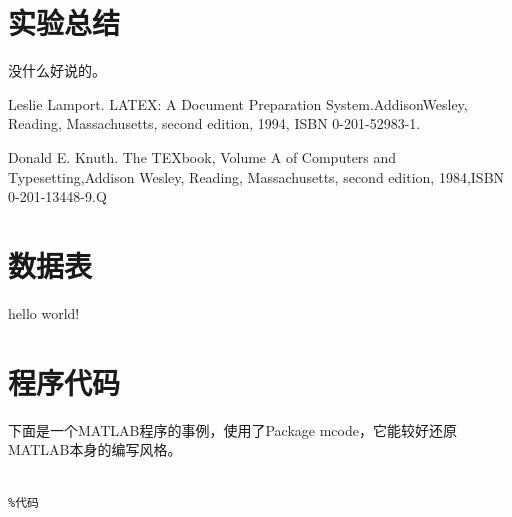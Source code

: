 \documentclass[a4paper,12pt]{report}
\begin{document}
\chapter{实验总结}
\begin{spacing}{1.5}
	没什么好说的。
\end{spacing}


\begin{thebibliography}{99}
\songti {} 	
	Leslie Lamport. LATEX: A Document Preparation System.AddisonWesley, Reading, Massachusetts, second edition, 1994, ISBN 0-201-52983-1.
	
	Donald E. Knuth. The TEXbook, Volume A of Computers and Typesetting,Addison Wesley, Reading, Massachusetts, second edition, 1984,ISBN 0-201-13448-9.Q

	
\end{thebibliography}

\lstset{breaklines}                %
\lstset{extendedchars=false}
\lstset{language=Matlab}
\renewcommand{\thechapter}{附录\Alph{chapter}.} 
\appendix
\begin{appendix}
	
\chapter{数据表}
\songti
\begin{spacing}{1.5}
	hello world!
\end{spacing}


\chapter{程序代码}
\songti
\begin{spacing}{1.5}
下面是一个MATLAB程序的事例，使用了Package mcode，它能较好还原MATLAB本身的编写风格。
\begin{lstlisting}

%代码

\end{lstlisting}
\end{spacing}
\end{appendix}

	
\end{document}
